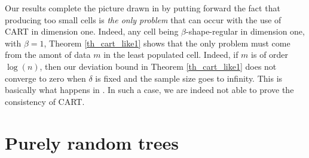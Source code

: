 \documentclass[paper=a4, fontsize=11pt]{scrartcl}
\begin{document}
Our results complete the picture drawn in \cite{cattaneo2022pointwise} by putting forward the fact that producing too small cells is \textit{the only problem} that can occur with the use of CART in dimension one. Indeed, any cell being $\beta$-shape-regular in dimension one, with $\beta=1$, Theorem \ref{th_cart_like1} shows that the only problem must come from the amont of data $m$ in the least populated cell. Indeed, if $m$ is of order $\log(n)$, then our deviation bound in Theorem \ref{th_cart_like1} does not converge to zero when $\delta$ is fixed and the sample size goes to infinity. This is basically what happens in \cite{cattaneo2022pointwise}. In such a case, we are indeed not able to prove the consistency of CART. 







\section{Purely random trees}\label{sec_PRT}




\end{document}
